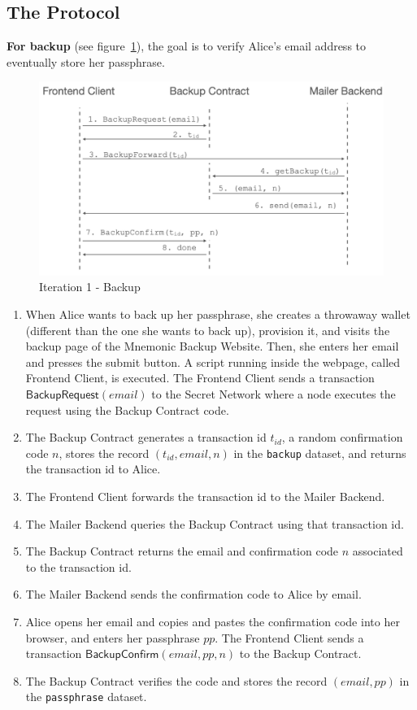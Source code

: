 \documentclass[runningheads]{llncs}
\newcommand{\ms}[1]{\ensuremath{\mathsf{#1}}}
\begin{document}
\subsection{The Protocol}

{\bf For backup} (see figure~\ref{it1:backup}), the goal is to verify Alice's email address to eventually store her passphrase. 

\begin{figure}[t]
  \includegraphics[width=\linewidth]{./media/media-001.png}
  \caption{Iteration 1 - Backup}
  \label{it1:backup}
\end{figure}

\begin{enumerate} 
\item When Alice wants to back up her passphrase, she creates a throwaway wallet (different than the one she wants to back up), provision it, and visits the backup page of the Mnemonic Backup Website. Then, she enters her email and presses the submit button. A script running inside the webpage, called Frontend Client, is executed. The Frontend Client sends a transaction {\bf $\ms{BackupRequest}(email)$} to the Secret Network where a node executes the request using the Backup Contract code. 
\item The Backup Contract generates a transaction id $t_{id}$, a random confirmation code $n$, stores the record $(t_{id}, email, n)$ in the {\tt backup} dataset, and returns the transaction id to Alice.
\item The Frontend Client forwards the transaction id to the Mailer Backend. 
\item The Mailer Backend queries the Backup Contract using that transaction id. 
\item The Backup Contract returns the email and confirmation code $n$ associated to the transaction id. 
\item The Mailer Backend sends the confirmation code to Alice by email. 
\item Alice opens her email and copies and pastes the confirmation code into her browser, and enters her passphrase $pp$. The Frontend Client sends a transaction $\ms{BackupConfirm}(email, pp, n)$ to the Backup Contract. 
\item The Backup Contract verifies the code and stores the record $(email, pp)$ in the {\tt passphrase} dataset. 
\end{enumerate}
\end{document}
